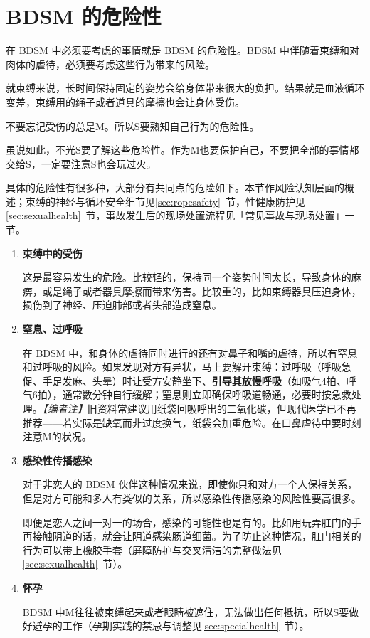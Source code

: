 \documentclass[12pt,UTF8]{ctexbook}
\begin{document}
\section{BDSM 的危险性}

在 BDSM 中必须要考虑的事情就是 BDSM 的危险性。BDSM 中伴随着束缚和对肉体的虐待，必须要考虑这些行为带来的风险。

就束缚来说，长时间保持固定的姿势会给身体带来很大的负担。结果就是血液循环变差，束缚用的绳子或者道具的摩擦也会让身体受伤。

不要忘记受伤的总是M。所以S要熟知自己行为的危险性。

虽说如此，不光S要了解这些危险性。作为M也要保护自己，不要把全部的事情都交给S，一定要注意S也会玩过火。

具体的危险性有很多种，大部分有共同点的危险如下。本节作风险认知层面的概述；束缚的神经与循环安全细节见\ref{sec:ropesafety}~节，性健康防护见\ref{sec:sexualhealth}~节，事故发生后的现场处置流程见「常见事故与现场处置」一节。

\begin{enumerate}
	\item \textbf{束缚中的受伤}

	这是最容易发生的危险。比较轻的，保持同一个姿势时间太长，导致身体的麻痹，或是绳子或者器具摩擦而带来伤害。比较重的，比如束缚器具压迫身体，损伤到了神经、压迫肺部或者头部造成窒息。

	\item \textbf{窒息、过呼吸}

	在 BDSM 中，和身体的虐待同时进行的还有对鼻子和嘴的虐待，所以有窒息和过呼吸的风险。如果发现对方有异状，马上要解开束缚：过呼吸（呼吸急促、手足发麻、头晕）时让受方安静坐下、\textbf{引导其放慢呼吸}（如吸气4拍、呼气6拍），通常数分钟自行缓解；窒息则立即确保呼吸道畅通，必要时按急救处理。\textit{【编者注】}旧资料常建议用纸袋回吸呼出的二氧化碳，但现代医学已不再推荐——若实际是缺氧而非过度换气，纸袋会加重危险。在口鼻虐待中要时刻注意M的状况。

	\item \textbf{感染性传播感染}

	对于非恋人的 BDSM 伙伴这种情况来说，即使你只和对方一个人保持关系，但是对方可能和多人有类似的关系，所以感染性传播感染的风险性要高很多。

	即便是恋人之间一对一的场合，感染的可能性也是有的。比如用玩弄肛门的手再接触阴道的话，就会让阴道感染肠道细菌。为了防止这种情况，肛门相关的行为可以带上橡胶手套（屏障防护与交叉清洁的完整做法见\ref{sec:sexualhealth}~节）。

	\item \textbf{怀孕}

	BDSM 中M往往被束缚起来或者眼睛被遮住，无法做出任何抵抗，所以S要做好避孕的工作（孕期实践的禁忌与调整见\ref{sec:specialhealth}~节）。
\end{enumerate}
\end{document}
